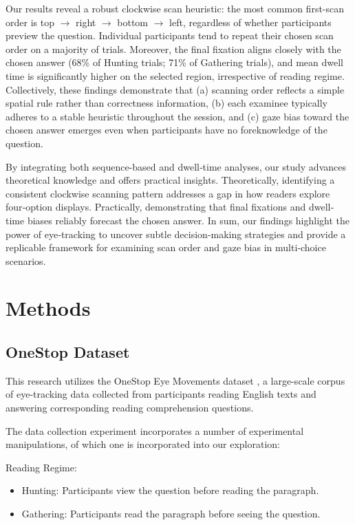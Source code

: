 \documentclass{article}
\begin{document}
    Our results reveal a robust clockwise scan heuristic: the most common first-scan order is top $\to$ right $\to$ bottom $\to$ left, regardless of whether participants preview the question. Individual participants tend to repeat their chosen scan order on a majority of trials. Moreover, the final fixation aligns closely with the chosen answer (68\% of Hunting trials; 71\% of Gathering trials), and mean dwell time is significantly higher on the selected region, irrespective of reading regime. Collectively, these findings demonstrate that (a) scanning order reflects a simple spatial rule rather than correctness information, (b) each examinee typically adheres to a stable heuristic throughout the session, and (c) gaze bias toward the chosen answer emerges even when participants have no foreknowledge of the question.

    By integrating both sequence‐based and dwell‐time analyses, our study advances theoretical knowledge and offers practical insights. Theoretically, identifying a consistent clockwise scanning pattern addresses a gap in how readers explore four‐option displays. Practically, demonstrating that final fixations and dwell‐time biases reliably forecast the chosen answer. In sum, our findings highlight the power of eye‐tracking to uncover subtle decision‐making strategies and provide a replicable framework for examining scan order and gaze bias in multi‐choice scenarios.

\section{Methods}
    \subsection{OneStop Dataset}
    This research utilizes the OneStop Eye Movements dataset  \parencite{berzak2025onestop}, a large-scale corpus of eye-tracking data collected from participants reading English texts and answering corresponding reading comprehension questions.

    The data collection experiment incorporates a number of experimental manipulations, of which one is incorporated into our exploration:

    Reading Regime:
    \begin{itemize}
        \item Hunting: Participants view the question before reading the paragraph.
        \item Gathering: Participants read the paragraph before seeing the question.
    \end{itemize}
\end{document}
